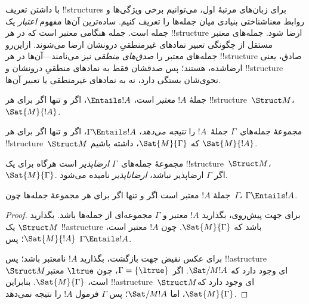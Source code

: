 \documentclass[../../../include/open-logic-section]{subfiles}
\begin{document}

\begin{explain}
با داشتن تعریف !!{structure}s برای زبان‌های مرتبهٔ اول، می‌توانیم برخی
ویژگی‌ها و روابط معناشناختی بنیادی میان جمله‌ها را تعریف کنیم. ساده‌ترین
آن‌ها مفهوم \emph{اعتبار} یک جمله است. جمله هنگامی معتبر است که در هر
!!{structure} ارضا شود. جمله‌های معتبر مستقل از چگونگی تعبیر نمادهای
غیرمنطقیِ درونشان ارضا می‌شوند. ازاین‌رو جمله‌های معتبر را \emph{صدق‌های
منطقی} نیز می‌نامند---آن‌ها در هر !!{structure} صادق، یعنی ارضاشده، هستند؛
پس صدقشان فقط به نمادهای منطقیِ درونشان و !!{structure} نحوی‌شان بستگی
دارد، نه به نمادهای غیرمنطقی یا تعبیر آن‌ها.
\end{explain}

\begin{defn}[اعتبار]
جملهٔ $!A$ \emph{معتبر} است، $\Entails !A$، اگر و تنها اگر برای هر
!!{structure}~$\Struct M$، $\Sat{M}{!A}$.
\end{defn}

\begin{defn}[استلزام]
مجموعهٔ جمله‌های~$\Gamma$ جملهٔ~$!A$ را \emph{نتیجه می‌دهد}،
$\Gamma \Entails !A$، اگر و تنها اگر برای هر !!{structure}~$\Struct M$
که $\Sat{M}{\Gamma}$، داشته باشیم $\Sat{M}{!A}$.
\end{defn}


\begin{defn}[ارضاپذیری]
مجموعهٔ جمله‌های~$\Gamma$ \emph{ارضاپذیر} است هرگاه برای یک
!!{structure}~$\Struct M$، $\Sat{M}{\Gamma}$. اگر $\Gamma$ ارضاپذیر
نباشد، \emph{ارضاناپذیر} نامیده می‌شود.
\end{defn}

\begin{prop}
جملهٔ $!A$ معتبر است اگر و تنها اگر برای هر مجموعهٔ جمله‌ها چون~$\Gamma$،
$\Gamma \Entails !A$.
\end{prop}

\begin{proof}
برای جهت پیش‌روی، بگذارید $!A$ معتبر و $\Gamma$ مجموعه‌ای از جمله‌ها باشد.
بگذارید $\Struct M$ یک !!a{structure} باشد که $\Sat{M}{\Gamma}$. چون $!A$
معتبر است، $\Sat{M}{!A}$؛ پس $\Gamma \Entails !A$.

برای عکس نقیض جهت بازگشت، بگذارید $!A$ نامعتبر باشد؛ پس
!!a{structure}~$\Struct M$ای وجود دارد که $\Sat/{M}{!A}$. اگر
$\Gamma = \{ \ltrue \}$، چون $\ltrue$ معتبر است، $\Sat{M}{\Gamma}$.
بنابراین !!a{structure}~$\Struct M$ای وجود دارد که $\Sat{M}{\Gamma}$، اما
$\Sat/{M}{!A}$؛ پس $\Gamma$ فرمول $!A$ را نتیجه نمی‌دهد.
\end{proof}
\end{document}
